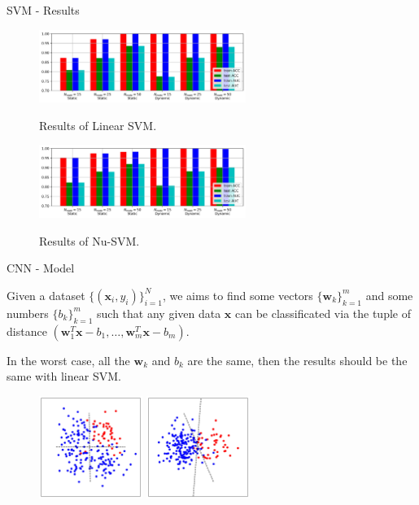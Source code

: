 \documentclass{beamer}
\begin{document}
\begin{frame}{SVM - Results}

    \begin{figure}[H]
        \centering
        \includegraphics[width=0.6\textwidth]{../SVM/linear_0.1.jpg} \\
        \caption{Results of Linear SVM.}
    \end{figure}

    \begin{figure}[H]
        \centering
        \includegraphics[width=0.6\textwidth]{../SVM/nu_0.1.jpg} \\
        \caption{Results of Nu-SVM.}
    \end{figure}

\end{frame}

\begin{frame}{CNN - Model}

    Given a dataset $\{ (\mathbf{x}_i, y_i) \}_{i=1}^N$, we aims to find some vectors $\{\mathbf{w}_k\}_{k=1}^m$ and some numbers $\{b_k\}_{k=1}^m$ such that any given data $\mathbf{x}$ can be classificated via the tuple of distance $( \mathbf{w}_1^T \mathbf{x} - b_1, \dots, \mathbf{w}_m^T \mathbf{x} - b_m )$.

    In the worst case, all the $\mathbf{w}_k$ and $b_k$ are the same, then the results should be the same with linear SVM.

    \begin{figure}[H]
        \centering
        \includegraphics[width=0.3\textwidth]{./figure/model.jpg}
        \includegraphics[width=0.3\textwidth]{./figure/model_worse.jpg}
    \end{figure}

\end{frame}
\end{document}
